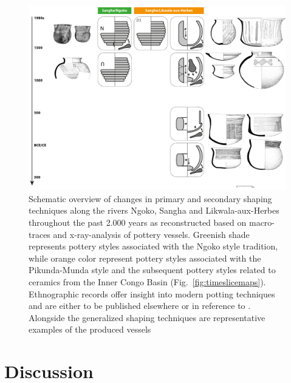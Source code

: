 \documentclass[smallextended,natbib]{svjour3}       %
\begin{document}
\begin{figure}[!tb]
	\includegraphics[width=\textwidth]{Fig_ShapingTech_Schema.pdf}
	\caption{Schematic overview of changes in primary and secondary shaping techniques along the rivers Ngoko, Sangha and Likwala-aux-Herbes throughout the past 2.000 years as reconstructed based on macro-traces and x-ray-analysis of pottery vessels. Greenish shade represents pottery styles associated with the Ngoko style tradition, while orange color represent pottery styles associated with the Pikunda-Munda style and the subsequent pottery styles related to ceramics from the Inner Congo Basin (Fig.~\ref{fig:timeslicemaps}). Ethnographic records offer insight into modern potting techniques and are either to be published elsewhere \citep{Eggert.inVorb.} or in reference to \citet[25--35; {[1]}]{MpikaNgoma.1996}. Alongside the generalized shaping techniques are representative examples of the produced vessels \citep[cf.][]{Seidensticker.2021e,Seidensticker.2024}}
	\label{fig:schema}
\end{figure}

\section{Discussion}

\end{document}

